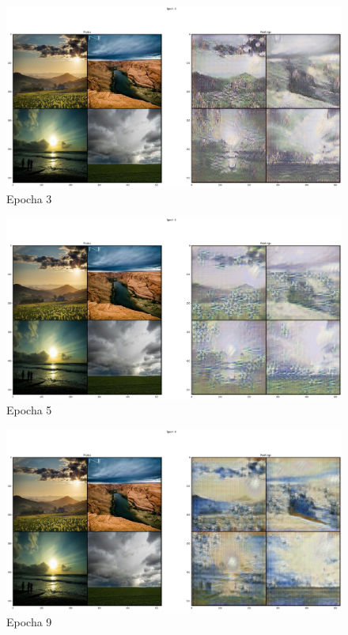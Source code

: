 \documentclass[czech]{mvi-report}
\begin{document}
\begin{figure}[h!]
  \centering\leavevmode
  \includegraphics[width=1\linewidth]{img/epochs/e03}\vskip-0.5cm
  \caption{Epocha 3}
  \label{fig:epoch-3}
\end{figure}

\begin{figure}[h!]
  \centering\leavevmode
  \includegraphics[width=1\linewidth]{img/epochs/e05}\vskip-0.5cm
  \caption{Epocha 5}
  \label{fig:epoch-5}
\end{figure}

\begin{figure}[h!]
  \centering\leavevmode
  \includegraphics[width=1\linewidth]{img/epochs/e09}\vskip-0.5cm
  \caption{Epocha 9}
  \label{fig:epoch-9}
\end{figure}
\end{document}

